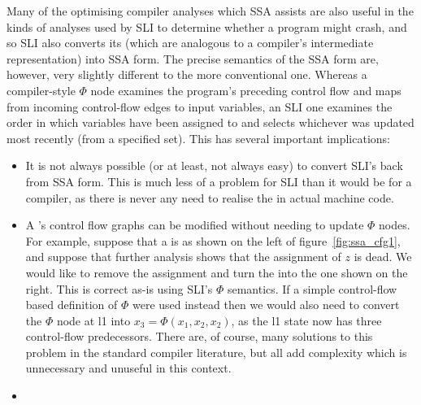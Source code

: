 Many of the optimising compiler analyses which SSA assists are also useful in the kinds of analyses used by SLI to determine whether a program might crash, and so SLI also converts its \StateMachines (which are analogous to a compiler's intermediate representation) into SSA form.
The precise semantics of the SSA form are, however, very slightly different to the more conventional one.
Whereas a compiler-style $\Phi$ node examines the program's preceding control flow and maps from incoming control-flow edges to input variables, an SLI one examines the order in which variables have been assigned to and selects whichever was updated most recently (from a specified set).
This has several important implications:

\begin{itemize}
\item
  It is not always possible (or at least, not always easy) to convert SLI's \StateMachines back from SSA form.
  This is much less of a problem for SLI than it would be for a compiler, as there is never any need to realise the \StateMachines in actual machine code.
\item
  A {\StateMachine}'s control flow graphs can be modified without needing to update $\Phi$ nodes.
  For example, suppose that a \StateMachine is as shown on the left of figure~\ref{fig:ssa_cfg1}, and suppose that further analysis shows that the assignment of $z$ is dead.
  We would like to remove the assignment and turn the \StateMachine into the one shown on the right.
  This is correct as-is using SLI's $\Phi$ semantics.
  If a simple control-flow based definition of $\Phi$ were used instead then we would also need to convert the $\Phi$ node at l1 into $x_3 = \Phi(x_1, x_2, x_2)$, as the l1 state now has three control-flow predecessors.
  There are, of course, many solutions to this problem in the standard compiler literature\needCite{}, but all add complexity which is unnecessary and unuseful in this context.
\item
\end{itemize}


